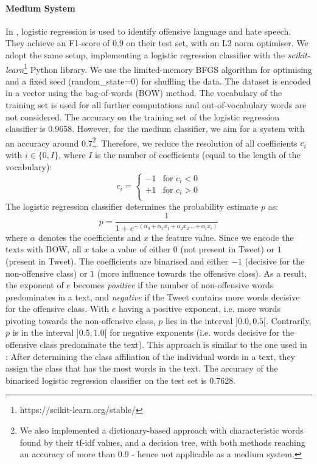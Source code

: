 \paragraph{Medium System}
In \cite{davidson2017automated}, logistic regression is used to identify offensive language and hate speech. They achieve an F1-score of 0.9 on their test set, with an L2 norm optimiser. We adopt the same setup, implementing a logistic regression classifier with the \textit{scikit-learn}\footnote{https://scikit-learn.org/stable/} Python library. We use the limited-memory BFGS algorithm for optimising and a fixed seed (random\_state=0) for shuffling the data. The dataset is encoded in a vector using the bag-of-words (BOW) method. The vocabulary of the training set is used for all further computations and out-of-vocabulary words are not considered. The accuracy on the training set of the logistic regression classifier is 0.9658. However, for the medium classifier, we aim for a system with an accuracy around 0.7\setcounter{footnote}{0}\renewcommand*{\thefootnote}{\fnsymbol{footnote}}\footnote{We also implemented a dictionary-based approach with characteristic words found by their tf-idf values, and a decision tree, with both methods reaching an accuracy of more than 0.9 - hence not applicable as a medium system.}\renewcommand*{\thefootnote}{\arabic{footnote}}\setcounter{footnote}{18}. Therefore, we reduce the resolution of all coefficients $c_i$ with $i \in \{0,I\}$, where $I$ is the number of coefficients (equal to the length of the vocabulary): 
\[c_i =
\begin{cases}
	-1 & \text{for   } c_i<0 \\
	+1 & \text{for   } c_i>0 \\
\end{cases}\]
The logistic regression classifier determines the probability estimate $p$ as:
\[
p=\frac{1}{1+e^{-(\alpha_0+\alpha_1x_1+\alpha_2x_2...+\alpha_ix_i)}}
\]
where $\alpha$ denotes the coefficients and $x$ the feature value. Since we encode the texts with BOW, all $x$ take a value of either $0$ (not present in Tweet) or $1$ (present in Tweet). The coefficients are binarised and either $-1$ (decisive for the non-offensive class) or $1$ (more influence towards the offensive class). As a result, the exponent of $e$ becomes \textit{positive} if the number of non-offensive words predominates in a text, and \textit{negative} if the Tweet contains more words decisive for the offensive class. With $e$ having a positive exponent, i.e. more words pivoting towards the non-offensive class, $p$ lies in the interval $]0.0,0.5[$. Contrarily, $p$ is in the interval $]0.5,1.0[$ for negative exponents (i.e. words decisive for the offensive class predominate the text). This approach is similar to the one used in \cite{klenner2018offensive}: After determining the class affiliation of the individual words in a text, they assign the class that has the most words in the text. The accuracy of the binarised logistic regression classifier on the test set is 0.7628.

